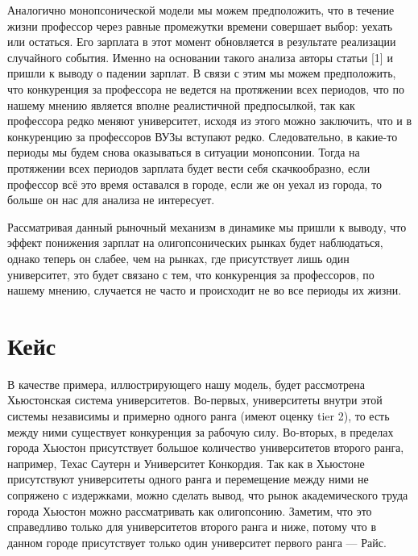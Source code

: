 \documentclass[a4paper, 12pt]{article}
\theoremstyle{definition}
\theoremstyle{plain}
\begin{document}
Аналогично монопсонической модели мы можем предположить, что в течение жизни профессор через равные промежутки времени совершает выбор: уехать или остаться.  Его зарплата в этот момент обновляется в результате реализации случайного события.  Именно на основании такого анализа авторы статьи [1] и пришли к выводу о падении зарплат. В связи с этим мы можем предположить, что конкуренция за профессора не ведется на протяжении всех периодов, что по нашему мнению является вполне реалистичной предпосылкой, так как профессора редко меняют университет, исходя из этого можно заключить, что и в конкуренцию за профессоров ВУЗы вступают редко. Следовательно, в какие-то периоды мы будем снова оказываться в ситуации монопсонии. Тогда на протяжении всех периодов зарплата будет вести себя скачкообразно, если профессор всё это время оставался в городе, если же он уехал из города, то больше он нас для анализа не интересует. %

Рассматривая данный рыночный механизм в динамике мы пришли к выводу, что эффект понижения зарплат на олигопсонических рынках будет наблюдаться, однако теперь он слабее, чем на рынках, где присутствует лишь один университет, это будет связано с тем, что конкуренция за профессоров, по нашему мнению, случается не часто и происходит не во все периоды их жизни. 

\section{Кейс}

В качестве примера, иллюстрирующего нашу модель, будет рассмотрена Хьюстонская система университетов. Во-первых, университеты внутри этой системы независимы и примерно одного ранга (имеют оценку tier 2), то есть между ними существует конкуренция за рабочую силу. Во-вторых, в пределах города Хьюстон присутствует большое количество университетов второго ранга, например, Техас Саутерн и Университет Конкордия. Так как в Хьюстоне присутствуют университеты одного ранга и перемещение между ними не сопряжено с издержками, можно сделать вывод, что рынок академического труда города Хьюстон можно рассматривать как олигопсонию. Заметим, что это справедливо только для университетов второго ранга и ниже, потому что в данном городе присутствует только один университет первого ранга — Райс.
\end{document}
